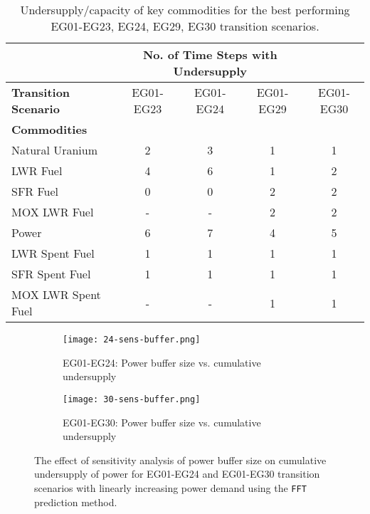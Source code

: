\begin{table}[]
	\centering
        \caption{Undersupply/capacity of key commodities for the best performing EG01-EG23, EG24, EG29, EG30 transition scenarios.}
		\label{tab:all-power-fin}
        \begin{tabular}{lcccc}
		\hline
		& \multicolumn{3}{c}{\textbf{No. of Time Steps with Undersupply}} \\ \hline
		\textbf{Transition Scenario} & EG01-EG23 & 
		EG01-EG24 & EG01-EG29 & EG01-EG30 \\ \hline 
		\textbf{Commodities} \\ 
		Natural Uranium		    & 2 	& 3  &  1  & 1 \\ 
		\gls{LWR} Fuel     	    & 4 	& 6  &  1  & 2\\ 
		\gls{SFR} Fuel     	    &  0 	& 0  &  2  & 2\\ 
		\gls{MOX} \gls{LWR} Fuel &-&-&2&2 \\
		Power      				&  6 	& 7  &  4 &  5\\ 
		\gls{LWR} Spent Fuel	& 1 	& 1  & 1 & 1\\ 
		\gls{SFR} Spent Fuel     	    &  1 	& 1  &  1  & 1\\ 
		\gls{MOX} \gls{LWR} Spent Fuel &-&-&1&1 \\ \hline 
	\end{tabular}
\end{table}

\begin{figure}[]
	\centering
	\begin{subfigure}[t]{\textwidth}
		\centering
		\texttt{[image: 24-sens-buffer.png]} 
		\caption{EG01-EG24: Power buffer size vs. cumulative undersupply}
		\label{fig:eg24-bufplot}
	\end{subfigure}
	\begin{subfigure}[t]{\textwidth}
		\centering
		\texttt{[image: 30-sens-buffer.png]} 
		\caption{EG01-EG30: Power buffer size vs. cumulative undersupply}
		\label{fig:eg30-bufplot}
	\end{subfigure}
	\hfill
	\caption{The effect of sensitivity analysis of power buffer size on cumulative 
	undersupply of power for EG01-EG24 and EG01-EG30 transition scenarios 
	with linearly increasing power demand using the \texttt{FFT} prediction method.}
	\label{fig:sabuffer}
\end{figure}

